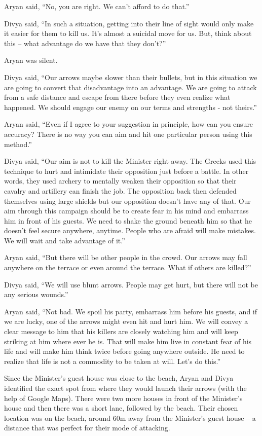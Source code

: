 Aryan said, “No, you are right. We can't afford to do that.”

Divya said, “In such a situation, getting into their line of sight would only
make it easier for them to kill us. It's almost a suicidal move for us. But,
think about this – what advantage do we have that they don't?”

Aryan was silent.

Divya said, “Our arrows maybe slower than their bullets, but in this situation
we are going to convert that disadvantage into an advantage. We are going to
attack from a safe distance and escape from there before they even realize what
happened. We should engage our enemy on our terms and strengths - not theirs.”

Aryan said, “Even if I agree to your suggestion in principle, how can you ensure
accuracy? There is no way you can aim and hit one particular person using this
method.”

Divya said, “Our aim is not to kill the Minister right away. The Greeks used
this technique to hurt and intimidate their opposition just before a battle. In
other words, they used archery to mentally weaken their opposition so that their
cavalry and artillery can finish the job. The opposition back then defended
themselves using large shields but our opposition doesn't have any of that. Our
aim through this campaign should be to create fear in his mind and embarrass him
in front of his guests. We need to shake the ground beneath him so that he
doesn't feel secure anywhere, anytime. People who are afraid will make mistakes.
We will wait and take advantage of it.”

Aryan said, “But there will be other people in the crowd. Our arrows may fall
anywhere on the terrace or even around the terrace. What if others are killed?”

Divya said, “We will use blunt arrows. People may get hurt, but there will not
be any serious wounds.”

Aryan said, “Not bad. We spoil his party, embarrass him before his guests, and
if we are lucky, one of the arrows might even hit and hurt him. We will convey a
clear message to him that his killers are closely watching him and will keep
striking at him where ever he is. That will make him live in constant fear of
his life and will make him think twice before going anywhere outside. He need to
realize that life is not a commodity to be taken at will. Let's do this.”

Since the Minister's guest house was close to the beach, Aryan and Divya
identified the exact spot from where they would launch their arrows (with the
help of Google Maps). There were two more houses in front of the Minister's
house and then there was a short lane, followed by the beach. Their chosen
location was on the beach, around 60m away from the Minister's guest house – a
distance that was perfect for their mode of attacking.

